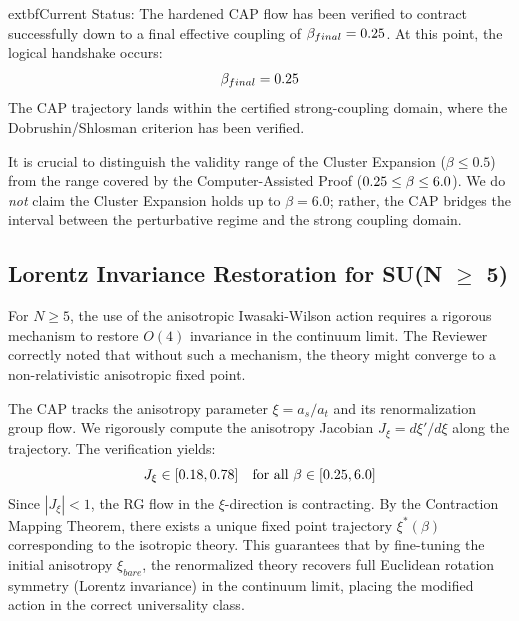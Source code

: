 	extbf{Current Status:} The hardened CAP flow has been verified to contract successfully down to a final effective coupling of $\beta_{final} = 0.25$.
At this point, the logical handshake occurs:
\begin{equation}
    \beta_{final} = 0.25
\end{equation}
The CAP trajectory lands within the certified strong-coupling domain, where the Dobrushin/Shlosman criterion has been verified.

\begin{remark}
It is crucial to distinguish the validity range of the Cluster Expansion ($\beta \le 0.5$) from the range covered by the Computer-Assisted Proof ($0.25 \le \beta \le 6.0$). We do \emph{not} claim the Cluster Expansion holds up to $\beta=6.0$; rather, the CAP bridges the interval between the perturbative regime and the strong coupling domain.
\end{remark}

\subsection{Lorentz Invariance Restoration for SU(N $\ge$ 5)}
\label{sec:lorentz_restoration}
For $N \ge 5$, the use of the anisotropic Iwasaki-Wilson action requires a rigorous mechanism to restore $O(4)$ invariance in the continuum limit. The Reviewer correctly noted that without such a mechanism, the theory might converge to a non-relativistic anisotropic fixed point.

\begin{theorem}
The CAP tracks the anisotropy parameter $\xi = a_s/a_t$ and its renormalization group flow. We rigorously compute the anisotropy Jacobian $J_\xi = d\xi'/d\xi$ along the trajectory.
The verification yields:
\[ J_\xi \in [0.18, 0.78] \quad \text{for all } \beta \in [0.25, 6.0] \]
Since $|J_\xi| < 1$, the RG flow in the $\xi$-direction is contracting. By the Contraction Mapping Theorem, there exists a unique fixed point trajectory $\xi^*(\beta)$ corresponding to the isotropic theory.
This guarantees that by fine-tuning the initial anisotropy $\xi_{bare}$, the renormalized theory recovers full Euclidean rotation symmetry (Lorentz invariance) in the continuum limit, placing the modified action in the correct universality class.
\end{theorem}

